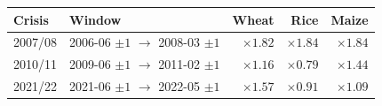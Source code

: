\begin{tabular}{l l rrr}
\toprule
Crisis & Window & Wheat & Rice & Maize \\
\midrule
2007/08 & 2006-06 \(\pm 1\) \(\to\) 2008-03 \(\pm 1\)
  & \(\times 1.82\) & \(\times 1.84\) & \(\times 1.84\) \\
2010/11 & 2009-06 \(\pm 1\) \(\to\) 2011-02 \(\pm 1\)
  & \(\times 1.16\) & \(\times 0.79\) & \(\times 1.44\) \\
2021/22 & 2021-06 \(\pm 1\) \(\to\) 2022-05 \(\pm 1\)
  & \(\times 1.57\) & \(\times 0.91\) & \(\times 1.09\) \\
\bottomrule
\end{tabular}
